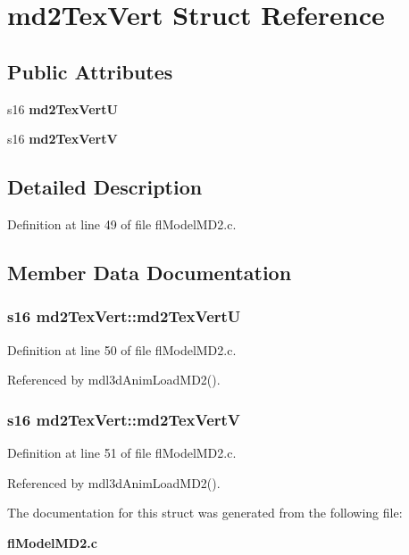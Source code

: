 \section{md2Tex\-Vert Struct Reference}
\label{structmd2TexVert}
\subsection*{Public Attributes}
\begin{CompactItemize}
\item 
s16 {\bf md2Tex\-Vert\-U}
\item 
s16 {\bf md2Tex\-Vert\-V}
\end{CompactItemize}


\subsection{Detailed Description}




Definition at line 49 of file fl\-Model\-MD2.c.

\subsection{Member Data Documentation}
\subsubsection{\setlength{\rightskip}{0pt plus 5cm}s16 {\bf md2Tex\-Vert::md2Tex\-Vert\-U}}\label{structmd2TexVert_8dcc61b6cc7df9317ddad0a29f6d835a}




Definition at line 50 of file fl\-Model\-MD2.c.

Referenced by mdl3d\-Anim\-Load\-MD2().
\subsubsection{\setlength{\rightskip}{0pt plus 5cm}s16 {\bf md2Tex\-Vert::md2Tex\-Vert\-V}}\label{structmd2TexVert_230ef7123d2db4aa9fad7dd3e59514e1}




Definition at line 51 of file fl\-Model\-MD2.c.

Referenced by mdl3d\-Anim\-Load\-MD2().

The documentation for this struct was generated from the following file:\begin{CompactItemize}
\item 
{\bf fl\-Model\-MD2.c}\end{CompactItemize}
